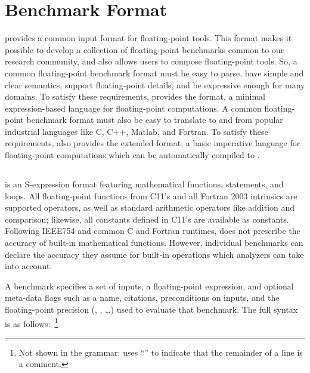 \documentclass[main.tex]{subfiles}
\begin{document}
\section{Benchmark Format}
\label{sec:format}

\name provides a common input format for floating-point tools.
This format makes it possible to develop
  a collection of floating-point benchmarks
  common to our research community,
  and also allows users to compose floating-point tools.
So, a common floating-point benchmark format must be
  easy to parse,
  have simple and clear semantics,
  support floating-point details, and
  be expressive enough for many domains.
To satisfy these requirements,
  \name provides the \core format,
  a minimal expression-based language
  for floating-point computations.
A common floating-point benchmark format
  must also be easy to translate to and from
  popular industrial languages like C, C++, Matlab, and Fortran.
To satisfy these requirements,
  \name also provides the extended \surface format,
  a basic imperative language for floating-point computations
  which can be automatically compiled to \core.

\subsection{\core}

\core is an S-expression format featuring
  mathematical functions,  statements, and  loops.
All floating-point functions
  from C11's  and all Fortran 2003 intrinsics
  are supported operators,
  as well as standard arithmetic operators like addition and comparison;
  likewise, all constants defined in C11's  are available as constants.
Following IEEE754 and common C and Fortran runtimes,
  \core does not prescribe the accuracy of built-in
  mathematical functions.
However, individual benchmarks can declare the accuracy
  they assume for built-in operations which
  analyzers can take into account.


A \core benchmark specifies a set of inputs,
  a floating-point expression,
  and optional meta-data flags such as
  a name, citations, preconditions on inputs,
  and the floating-point precision
  (, , \ldots)
  used to evaluate that benchmark.
The full \core syntax is as follows:~\footnote{
Not shown in the grammar:
  \name uses ``\C{;}'' to indicate that
  the remainder of a line is a comment.}
\end{document}
